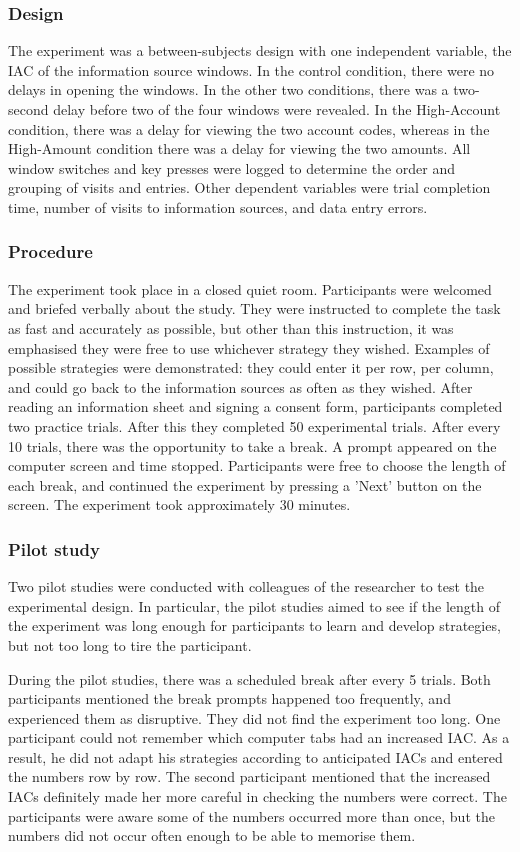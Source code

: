 \begin{table}
\begin{itemize}
\subsubsection{Design}
The experiment was a between-subjects design with one independent variable, the IAC of the information source windows. In the control condition, there were no delays in opening the windows. In the other two conditions, there was a two-second delay before two of the four windows were revealed. In the High-Account condition, there was a delay for viewing the two account codes, whereas in the High-Amount condition there was a delay for viewing the two amounts. All window switches and key presses were logged to determine the order and grouping of visits and entries. Other dependent variables were trial completion time, number of visits to information sources, and data entry errors.

\subsubsection{Procedure}
The experiment took place in a closed quiet room. Participants were welcomed and briefed verbally about the study. They were instructed to complete the task as fast and accurately as possible, but other than this instruction, it was emphasised they were free to use whichever strategy they wished. Examples of possible strategies were demonstrated: they could enter it per row, per column, and could go back to the information sources as often as they wished. After reading an information sheet and signing a consent form, participants completed two practice trials. After this they completed 50 experimental trials. After every 10 trials, there was the opportunity to take a break. A prompt appeared on the computer screen and time stopped. Participants were free to choose the length of each break, and continued the experiment by pressing a 'Next' button on the screen. The experiment took approximately 30 minutes.

\subsubsection{Pilot study}
Two pilot studies were conducted with colleagues of the researcher to test the experimental design. In particular, the pilot studies aimed to see if the length of the experiment was long enough for participants to learn and develop  strategies, but not too long to tire the participant.

During the pilot studies, there was a scheduled break after every 5 trials. Both participants mentioned the break prompts happened too frequently, and experienced them as disruptive. They did not find the experiment too long. One participant could not remember which computer tabs had an increased IAC. As a result, he did not adapt his strategies according to anticipated IACs and entered the numbers row by row. The second participant mentioned that the increased IACs definitely made her more careful in checking the numbers were correct. The participants were aware some of the numbers occurred more than once, but the numbers did not occur often enough to be able to memorise them. 


\end{itemize}
\end{table}
